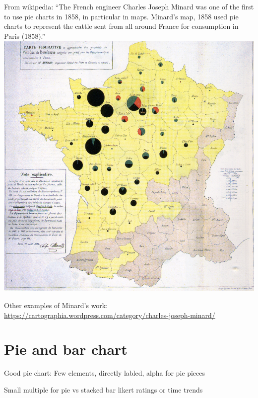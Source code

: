 \documentclass[]{krantz}
\theoremstyle{definition}
\theoremstyle{definition}
\theoremstyle{definition}
\theoremstyle{remark}
\begin{document}
From wikipedia: ``The French engineer Charles Joseph Minard was one of
the first to use pie charts in 1858, in particular in maps. Minard's
map, 1858 used pie charts to represent the cattle sent from all around
France for consumption in Paris (1858).''
\includegraphics{images/Minard_pie.png}

Other examples of Minard's work:
\url{https://cartographia.wordpress.com/category/charles-joseph-minard/}

\section{Pie and bar chart}\label{pie-and-bar-chart}

Good pie chart: Few elements, directly labled, alpha for pie pieces

Small multiple for pie vs stacked bar likert ratings or time trends
\end{document}
